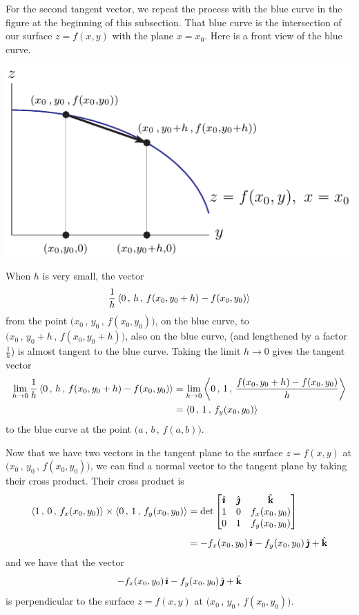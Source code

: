 For the second tangent vector, we repeat
the process with the blue curve in the figure at the beginning of this
subsection. That blue curve is the intersection of our surface $z=f(x,y)$ 
with the plane $x=x_0$.
Here is a front view of the blue curve. 
\begin{efig}
\begin{center}
   \includegraphics{tanPlaneBBside.pdf}
\end{center}
\end{efig}
When $h$ is very small, the vector 
\begin{equation*}
\frac{1}{h} \left< 0\,,\, h\,,\, f(x_0,y_0+h)-f(x_0,y_0)  \right>
\end{equation*}
from the point $\big(x_0\,,\,y_0\,,\,f(x_0,y_0)\big)$, on the
blue curve, to $\big(x_0\,,\,y_0+h\,,\,f(x_0,y_0+h)\big)$, 
also on the blue curve, (and lengthened by a factor $\frac{1}{h}$) is 
almost tangent to the blue curve. Taking the limit $h\rightarrow0$ gives the tangent vector
\begin{align*}
\lim_{h\rightarrow 0}\frac{1}{h} 
         \left< 0\,,\, h\,,\, f(x_0,y_0+h)-f(x_0,y_0)  \right>
&=\lim_{h\rightarrow 0} 
          \left< 0\,,\, 1\,,\, \frac{f(x_0,y_0+h)-f(x_0,y_0)}{h}  \right> \\
&=\left< 0\,,\, 1\,,\, f_y(x_0,y_0)\right>
\end{align*}
to the blue curve at the point  $\big(a\,,\,b\,,\,f(a,b)\big)$. 

Now that we have two vectors in the tangent plane to the surface $z=f(x,y)$ 
at $\big(x_0\,,\,y_0\,,\,f(x_0,y_0)\big)$, we can find a normal vector to 
the tangent plane by taking their cross product. Their cross product is
\begin{align*}
\left< 1\,,\, 0\,,\, f_x(x_0,y_0)\right>\times\left< 0\,,\, 1\,,\, f_y(x_0,y_0)\right>
&=\det\left[\begin{matrix}\hat{\pmb{\imath}}& \hat{\pmb{\jmath}} &\hat{\mathbf{k}}\\ 
                   1 & 0 & f_x(x_0,y_0)\\ 
                   0 & 1 & f_y(x_0,y_0)\end{matrix}\right] \\[0.05in]
&=-f_x(x_0,y_0)\,\hat{\pmb{\imath}} - f_y(x_0,y_0)\,\hat{\pmb{\jmath}} +\hat{\mathbf{k}}
\end{align*}
and we have that the vector
$$
-f_x(x_0,y_0)\,\hat{\pmb{\imath}} - f_y(x_0,y_0)\,\hat{\pmb{\jmath}} +\hat{\mathbf{k}}
$$
is perpendicular to the surface $z=f(x,y)$ at  $\big(x_0\,,\,y_0\,,\,f(x_0,y_0)\big)$.

